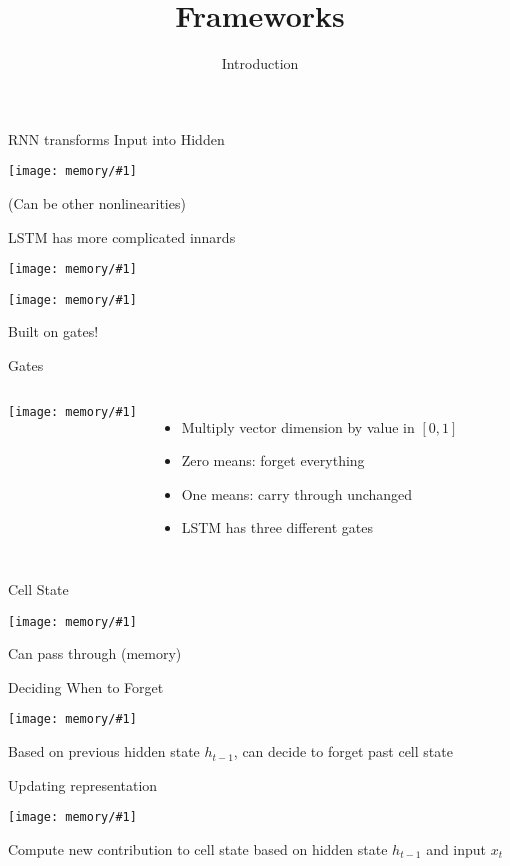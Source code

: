 \documentclass[compress]{beamer}
\title{Frameworks}
\date{Introduction}
\newcommand{\gfx}[2]{
\begin{center}
	\texttt{[image: memory/\#1]}
\end{center}
}
\begin{document}


\begin{frame}{RNN transforms Input into Hidden}

  \gfx{LSTM3-SimpleRNN}{.9}

  (Can be other nonlinearities)

\end{frame}

\begin{frame}{LSTM has more complicated innards}

  \gfx{LSTM3-chain}{.9}
  \gfx{LSTM2-notation}{.8}
  \pause
  Built on gates!

\end{frame}


\begin{frame}{Gates}

\begin{columns}
  \gfx{LSTM3-gate}{.7}
  \begin{itemize}
    \item Multiply vector dimension by value in $[0,1]$
    \item Zero means: forget everything
    \item One means: carry through unchanged
    \item LSTM has three different gates
  \end{itemize}
\end{columns}

\end{frame}


\begin{frame}{Cell State}

  \gfx{LSTM3-C-line}{.9}
  Can pass through (memory)
\end{frame}

\begin{frame}{Deciding When to Forget}

  \gfx{LSTM3-focus-f}{.9}

  Based on previous hidden state $h_{t-1}$, can decide to forget past cell state

\end{frame}

\begin{frame}{Updating representation}

  \gfx{LSTM3-focus-i}{.9}

  Compute new contribution to cell state based on hidden state
  $h_{t-1}$ and input $x_t$

\end{frame}
\end{document}
